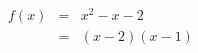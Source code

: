 \documentclass[12pt,a4paper]{article}
\begin{document}
\begin{eqnarray}
f(x)  &= & x^2-x-2 \nonumber \\
		 &= & (x-2)(x-1) \nonumber \\

\end{eqnarray}
\end{document}
